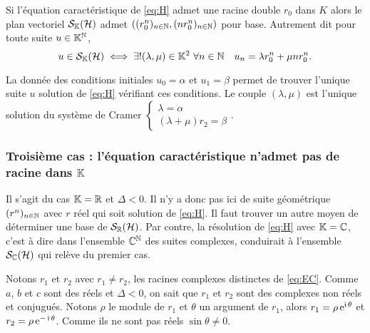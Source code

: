 \begin{theo}
  Si l'équation caractéristique de \eqref{eq:H} admet une racine double \(r_0\) 
  dans \(K\) alors le plan vectoriel \(\mathcal{S}_{\mathbb{K}}(\mathcal{H})\) admet \(((r_0^n)_{n \in 
  \mathbb{N}},(nr_0^n)_{n \in \mathbb{N}})\) pour base. Autrement dit pour toute suite \(u \in 
  \mathbb{K}^{\mathbb{N}}\),
  \begin{equation}
    u \in \mathcal{S}_{\mathbb{K}}(\mathcal{H}) \iff \exists! (\lambda,\mu) \in \mathbb{K}^2 \ \forall n \in \mathbb{N} 
    \quad u_n = \lambda r_0^n +\mu nr_0^n.
  \end{equation}
\end{theo}
La donnée des conditions initiales \(u_0=\alpha\) et \(u_1=\beta\) permet de 
trouver l'unique suite \(u\) solution de \eqref{eq:H} vérifiant ces conditions. 
Le couple \((\lambda, \mu)\) est l'unique solution du système de Cramer 
\(
\begin{cases}
  \lambda =\alpha \\ 
  (\lambda +\mu) r_2 =\beta 
\end{cases}
\).

\subsubsection{Troisième cas : l'équation caractéristique n'admet pas de 
racine dans \(\mathbb{K}\)}

Il s'agit du cas \(\mathbb{K}=\mathbb{R}\) et \(\Delta <0\). Il n'y a donc pas ici de suite 
géométrique \((r^n)_{n \in \mathbb{N}}\) avec \(r\) réel qui soit solution de 
\eqref{eq:H}. Il faut trouver un autre moyen de déterminer une base de 
\(\mathcal{S}_{\mathbb{R}}(\mathcal{H})\). Par contre, la résolution de \eqref{eq:H} avec \(\mathbb{K}=\mathbb{C}\), c'est 
à dire dans l'ensemble \(\mathbb{C}^{\mathbb{N}}\) des suites complexes, conduirait à l'ensemble 
\(\mathcal{S}_{\mathbb{C}}(\mathcal{H})\) qui relève du premier cas.

Notons \(r_1\) et \(r_2\) avec \(r_1 \neq r_2\), les racines complexes 
distinctes de \eqref{eq:EC}. Comme \(a\), \(b\) et \(c\) sont des réels et 
\(\Delta <0\), on sait que \(r_1\) et \(r_2\) sont des complexes non réels et 
conjugués. Notons \(\rho\) le module de \(r_1\) et \(\theta\) un argument de 
\(r_1\), alors \(r_1 = \rho\operatorname{e}^{\operatorname{i} \theta}\) et \(r_2 = \rho\operatorname{e}^{-\operatorname{i} 
\theta}\). Comme ils ne sont pas réels \(\sin \theta \neq 0\).

